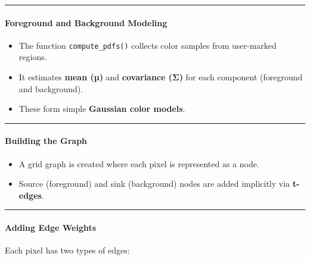 \documentclass[11pt]{article}
\providecommand{\tightlist}{%
      \setlength{\itemsep}{0pt}\setlength{\parskip}{0pt}}
\begin{document}
\begin{center}\rule{0.5\linewidth}{0.5pt}\end{center}

\hypertarget{foreground-and-background-modeling}{%
\paragraph{\texorpdfstring{\textbf{Foreground and Background
Modeling}}{Foreground and Background Modeling}}\label{foreground-and-background-modeling}}

\begin{itemize}
\tightlist
\item
  The function \texttt{compute\_pdfs()} collects color samples from
  user-marked regions.
\item
  It estimates \textbf{mean (µ)} and \textbf{covariance (Σ)} for each
  component (foreground and background).
\item
  These form simple \textbf{Gaussian color models}.
\end{itemize}

\begin{center}\rule{0.5\linewidth}{0.5pt}\end{center}

\hypertarget{building-the-graph}{%
\paragraph{\texorpdfstring{\textbf{Building the
Graph}}{Building the Graph}}\label{building-the-graph}}

\begin{itemize}
\tightlist
\item
  A grid graph is created where each pixel is represented as a node.
\item
  Source (foreground) and sink (background) nodes are added implicitly
  via \textbf{t-edges}.
\end{itemize}

\begin{center}\rule{0.5\linewidth}{0.5pt}\end{center}

\hypertarget{adding-edge-weights}{%
\paragraph{\texorpdfstring{\textbf{Adding Edge
Weights}}{Adding Edge Weights}}\label{adding-edge-weights}}

Each pixel has two types of edges:
\end{document}
